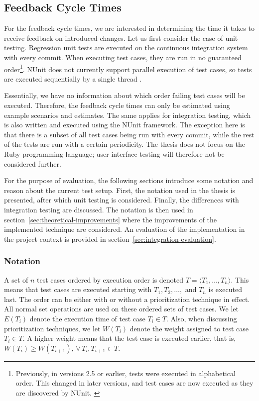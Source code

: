 \documentclass[a4paper,english,12pt]{report}
\begin{document}
\subsection{Feedback Cycle Times}\label{sec:project-cycle-times}
For the feedback cycle times, we are interested in determining the time it takes to receive feedback on introduced changes. Let us first consider the case of unit testing. Regression unit tests are executed on the continuous integration system with every commit. When executing test cases, they are run in no guaranteed order\footnote{Previously, in versions 2.5 or earlier, tests were executed in alphabetical order. This changed in later versions, and test cases are now executed as they are discovered by NUnit. \citep{poole2012test}}. NUnit does not currently support parallel execution of test cases, so tests are executed sequentially by a single thread \citep{poole2013parallel}. 

Essentially, we have no information about which order failing test cases will be executed. Therefore, the feedback cycle times can only be estimated using example scenarios and estimates. The same applies for integration testing, which is also written and executed using the NUnit framework. The exception here is that there is a subset of all test cases being run with every commit, while the rest of the tests are run with a certain periodicity. The thesis does not focus on the Ruby programming language; user interface testing will therefore not be considered further.

For the purpose of evaluation, the following sections introduce some notation and reason about the current test setup. First, the notation used in the thesis is presented, after which unit testing is considered. Finally, the differences with integration testing are discussed. The notation is then used in section~\vref{sec:theoretical-improvements} where the improvements of the implemented technique are considered. An evaluation of the implementation in the project context is provided in section~\vref{sec:integration-evaluation}.

\subsubsection{Notation}
A set of $n$ test cases ordered by execution order is denoted $T = \langle T_1,\ldots,T_n \rangle$. This means that test cases are executed starting with $T_1, T_2, \ldots, $ and $T_n$ is executed last. The order can be either with or without a prioritization technique in effect. All normal set operations are used on these ordered sets of test cases. We let $E(T_i)$ denote the execution time of test case $T_i \in T$. Also, when discussing prioritization techniques, we let $W(T_i)$ denote the weight assigned to test case $T_i \in T$. A higher weight means that the test case is executed earlier, that is, $W(T_i) \geq W(T_{i+1})$, $\forall\, T_i, T_{i+1} \in T$.
\end{document}
